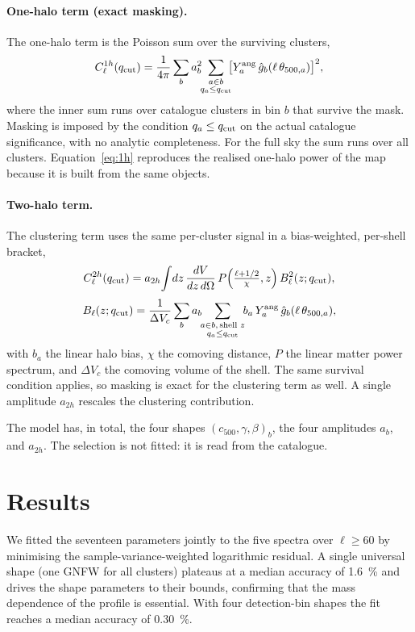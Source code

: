 \documentclass[twocolumn,10pt]{article}
\newcommand{\Cl}{C_\ell}
\newcommand{\yang}{Y^{\rm ang}}
\newcommand{\qcut}{q_{\rm cut}}
\newcommand{\ghat}{\hat{g}}
\begin{document}
\paragraph{One-halo term (exact masking).}
The one-halo term is the Poisson sum over the surviving clusters,
\begin{equation}
\Cl^{1h}(\qcut)=\frac{1}{4\pi}\sum_{b}a_b^2
\!\!\sum_{\substack{a\in b\\ q_a\le\qcut}}\!\!
\bigl[\yang_a\,\ghat_b(\ell\,\theta_{500,a})\bigr]^2 ,
\label{eq:1h}
\end{equation}
where the inner sum runs over catalogue clusters in bin $b$ that survive the mask.
Masking is imposed by the condition $q_a\le\qcut$ on the actual catalogue
significance, with no analytic completeness. For the full sky the sum runs over
all clusters. Equation~\eqref{eq:1h} reproduces the realised one-halo power of the
map because it is built from the same objects.

\paragraph{Two-halo term.}
The clustering term uses the same per-cluster signal in a bias-weighted,
per-shell bracket,
\begin{equation}
\Cl^{2h}(\qcut)=a_{2h}\!\int\! dz\,\frac{dV}{dz\,d\Omega}\,
P\!\left(\tfrac{\ell+1/2}{\chi},z\right) B_\ell^2(z;\qcut),
\end{equation}
\begin{equation}
B_\ell(z;\qcut)=\frac{1}{\Delta V_c}\sum_{b}a_b
\!\!\sum_{\substack{a\in b,\,\text{shell }z\\ q_a\le\qcut}}\!\!
b_a\,\yang_a\,\ghat_b(\ell\,\theta_{500,a}),
\end{equation}
with $b_a$ the linear halo bias, $\chi$ the comoving distance, $P$ the linear
matter power spectrum, and $\Delta V_c$ the comoving volume of the shell. The same
survival condition applies, so masking is exact for the clustering term as well.
A single amplitude $a_{2h}$ rescales the clustering contribution.

The model has, in total, the four shapes $(c_{500},\gamma,\beta)_b$, the four
amplitudes $a_b$, and $a_{2h}$. The selection is not fitted: it is read from the
catalogue.

\section{Results}
\label{sec:results}
We fitted the seventeen parameters jointly to the five spectra over
$\ell\ge60$ by minimising the sample-variance-weighted logarithmic residual.
A single universal shape (one GNFW for all clusters) plateaus at a median
accuracy of \SI{1.6}{\percent} and drives the shape parameters to their bounds,
confirming that the mass dependence of the profile is essential. With four
detection-bin shapes the fit reaches a median accuracy of \SI{0.30}{\percent}.
\end{document}
